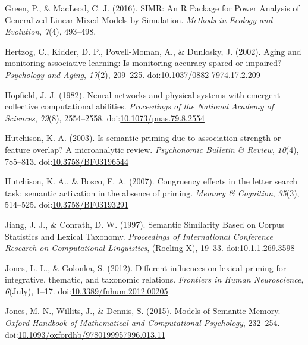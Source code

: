 \documentclass[english,man]{apa6}
\theoremstyle{definition}
\theoremstyle{definition}
\theoremstyle{remark}
\begin{document}
\hypertarget{ref-Green2016}{}
Green, P., \& MacLeod, C. J. (2016). SIMR: An R Package for Power
Analysis of Generalized Linear Mixed Models by Simulation. \emph{Methods
in Ecology and Evolution}, \emph{7}(4), 493--498.

\hypertarget{ref-Hertzog2002}{}
Hertzog, C., Kidder, D. P., Powell-Moman, A., \& Dunlosky, J. (2002).
Aging and monitoring associative learning: Is monitoring accuracy spared
or impaired? \emph{Psychology and Aging}, \emph{17}(2), 209--225.
doi:\href{https://doi.org/10.1037/0882-7974.17.2.209}{10.1037/0882-7974.17.2.209}

\hypertarget{ref-Hopfield1982}{}
Hopfield, J. J. (1982). Neural networks and physical systems with
emergent collective computational abilities. \emph{Proceedings of the
National Academy of Sciences}, \emph{79}(8), 2554--2558.
doi:\href{https://doi.org/10.1073/pnas.79.8.2554}{10.1073/pnas.79.8.2554}

\hypertarget{ref-Hutchison2003}{}
Hutchison, K. A. (2003). Is semantic priming due to association strength
or feature overlap? A microanalytic review. \emph{Psychonomic Bulletin
\& Review}, \emph{10}(4), 785--813.
doi:\href{https://doi.org/10.3758/BF03196544}{10.3758/BF03196544}

\hypertarget{ref-Hutchison2007}{}
Hutchison, K. A., \& Bosco, F. A. (2007). Congruency effects in the
letter search task: semantic activation in the absence of priming.
\emph{Memory \& Cognition}, \emph{35}(3), 514--525.
doi:\href{https://doi.org/10.3758/BF03193291}{10.3758/BF03193291}

\hypertarget{ref-Jiang1997}{}
Jiang, J. J., \& Conrath, D. W. (1997). Semantic Similarity Based on
Corpus Statistics and Lexical Taxonomy. \emph{Proceedings of
International Conference Research on Computational Linguistics},
(Rocling X), 19--33.
doi:\href{https://doi.org/10.1.1.269.3598}{10.1.1.269.3598}

\hypertarget{ref-Jones2012}{}
Jones, L. L., \& Golonka, S. (2012). Different influences on lexical
priming for integrative, thematic, and taxonomic relations.
\emph{Frontiers in Human Neuroscience}, \emph{6}(July), 1--17.
doi:\href{https://doi.org/10.3389/fnhum.2012.00205}{10.3389/fnhum.2012.00205}

\hypertarget{ref-Jones2015}{}
Jones, M. N., Willits, J., \& Dennis, S. (2015). Models of Semantic
Memory. \emph{Oxford Handbook of Mathematical and Computational
Psychology}, 232--254.
doi:\href{https://doi.org/10.1093/oxfordhb/9780199957996.013.11}{10.1093/oxfordhb/9780199957996.013.11}
\end{document}
